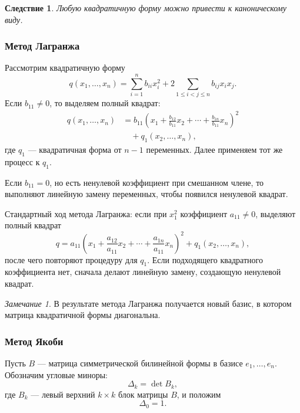 \documentclass[12pt,a4paper]{article}
\theoremstyle{definition}
\theoremstyle{plain}
\newtheorem{corollary}[definition]{Следствие}
\theoremstyle{remark}
\newtheorem{remark}[definition]{Замечание}
\newenvironment{knowledgefix}{\begin{clarifybox}}{\end{clarifybox}}
\begin{document}
\begin{corollary}
Любую квадратичную форму можно привести к каноническому виду.
\end{corollary}

\subsubsection*{Метод Лагранжа}

Рассмотрим квадратичную форму
\[
    q(x_1,\ldots,x_n)
    =\sum_{i=1}^n b_{ii}x_i^2
    +2\sum_{1\le i<j\le n} b_{ij}x_ix_j.
\]
Если $b_{11}\ne0$, то выделяем полный квадрат:
\[
\begin{aligned}
    q(x_1,\ldots,x_n)
    &=b_{11}\left(x_1+\frac{b_{12}}{b_{11}}x_2+\cdots+\frac{b_{1n}}{b_{11}}x_n\right)^2 \\
    &\quad + q_1(x_2,\ldots,x_n),
\end{aligned}
\]
где $q_1$ --- квадратичная форма от $n-1$ переменных.
Далее применяем тот же процесс к $q_1$.

Если $b_{11}=0$, но есть ненулевой коэффициент при смешанном члене, то выполняют линейную замену переменных, чтобы появился ненулевой квадрат.
\begin{knowledgefix}
Стандартный ход метода Лагранжа: если при \(x_1^2\) коэффициент \(a_{11}\ne0\), выделяют полный квадрат
\[q=a_{11}\left(x_1+\frac{a_{12}}{a_{11}}x_2+\cdots+\frac{a_{1n}}{a_{11}}x_n\right)^2+q_1(x_2,
\ldots,x_n),\]
после чего повторяют процедуру для \(q_1\). Если подходящего квадратного коэффициента нет, сначала делают линейную замену, создающую ненулевой квадрат.
\end{knowledgefix}

\begin{remark}
В результате метода Лагранжа получается новый базис, в котором матрица квадратичной формы диагональна.
\end{remark}

\subsubsection*{Метод Якоби}

Пусть $B$ --- матрица симметрической билинейной формы в базисе $e_1,\ldots,e_n$.
Обозначим угловые миноры:
\[
    \Delta_k=\det B_k,
\]
где $B_k$ --- левый верхний $k\times k$ блок матрицы $B$, и положим
\[
    \Delta_0=1.
\]
\end{document}
